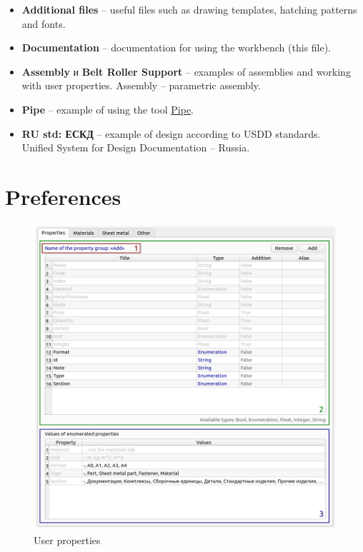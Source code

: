 \documentclass[a4paper,12pt]{article}
\begin{document}
\begin{itemize}
	\item \textbf{Additional files} -- useful files such as drawing templates, hatching patterns and fonts.
	\item \textbf{Documentation} -- documentation for using the workbench (this file).
	\item \textbf{Assembly} и \textbf{Belt Roller Support} -- examples of assemblies and working with user properties. Assembly -- parametric assembly.
	\item \textbf{Pipe} -- example of using the tool \hyperref[sec:9]{Pipe}.
	\item \textbf{RU std: ЕСКД} -- example of design according to USDD standards.\\Unified System for Design Documentation -- Russia.
\end{itemize}

\pagebreak




\section{Preferences}

\begin{figure}[htp]
	\centering
	\includegraphics[width=1.0\textwidth]{img/pref_uProp.png}
	\caption{User properties}
	\label{sec:pref_uProp}
\end{figure}
\end{document}

